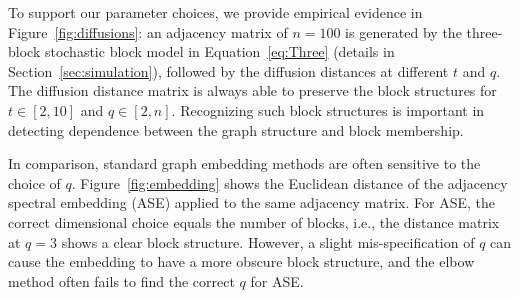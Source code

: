 \documentclass[11pt]{article}
\theoremstyle{definition}
\begin{document}
To support our parameter choices, we provide empirical evidence in Figure~\ref{fig:diffusions}: an adjacency matrix of $n=100$ is generated by the three-block stochastic block model in Equation~\ref{eq:Three} (details in Section~\ref{sec:simulation}), followed by the diffusion distances at different $t$ and $q$. The diffusion distance matrix is always able to preserve the block structures for $t \in [2,10]$ and $q \in [2,n]$. Recognizing such block structures is important in detecting dependence between the graph structure and block membership.

In comparison, standard graph embedding methods are often sensitive to the choice of $q$. Figure~\ref{fig:embedding} shows the Euclidean distance of the adjacency spectral embedding (ASE) \cite{SussmanEtAl2012} applied to the same adjacency matrix. For ASE, the correct dimensional choice equals the number of blocks, i.e., the distance matrix at $q=3$ shows a clear block structure. However, a slight mis-specification of $q$ can cause the embedding to have a more obscure block structure, and the elbow method often fails to find the correct $q$ for ASE.
\end{document}
